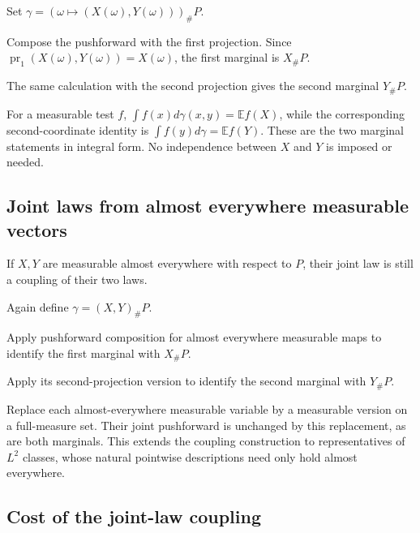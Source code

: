 \documentclass[11pt,a4paper]{report}
\begin{document}
Set \(\gamma=(\omega\mapsto(X(\omega),Y(\omega)))_\#P\).



Compose the pushforward with the first projection. Since \(\operatorname{pr}_1(X(\omega),Y(\omega))=X(\omega)\), the first marginal is \(X_\#P\).



The same calculation with the second projection gives the second marginal \(Y_\#P\).



For a measurable test \(f\), \(\int f(x)d\gamma(x,y)=\mathbb Ef(X)\), while the corresponding second-coordinate identity is \(\int f(y)d\gamma=\mathbb Ef(Y)\). These are the two marginal statements in integral form. No independence between \(X\) and \(Y\) is imposed or needed.

\subsection{\texorpdfstring{Joint laws from almost everywhere measurable vectors}{Joint laws from almost everywhere measurable vectors}}
\label{report-step-UnadjustedLangevin-Coupling-lean-7}


If \(X,Y\) are measurable almost everywhere with respect to \(P\), their joint law is still a coupling of their two laws.



Again define \(\gamma=(X,Y)_\#P\).



Apply pushforward composition for almost everywhere measurable maps to identify the first marginal with \(X_\#P\).



Apply its second-projection version to identify the second marginal with \(Y_\#P\).



Replace each almost-everywhere measurable variable by a measurable version on a full-measure set. Their joint pushforward is unchanged by this replacement, as are both marginals. This extends the coupling construction to representatives of \(L^2\) classes, whose natural pointwise descriptions need only hold almost everywhere.

\subsection{\texorpdfstring{Cost of the joint-law coupling}{Cost of the joint-law coupling}}
\label{report-step-UnadjustedLangevin-Coupling-lean-8}
\end{document}
